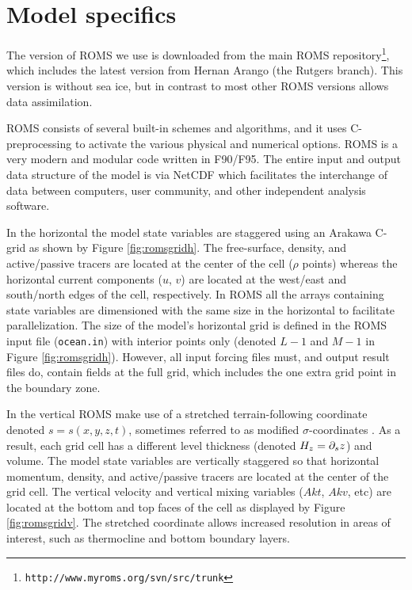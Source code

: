 \clearpage
\section{Model specifics}
\label{sec:setup}
The version of ROMS we use is downloaded from the main ROMS repository\footnote{\texttt{http://www.myroms.org/svn/src/trunk}}, which includes the latest version from Hernan Arango (the Rutgers branch). This version is without sea ice, but in contrast to most other ROMS versions allows data assimilation.

ROMS consists of several built-in schemes and algorithms, and it uses C-preprocessing to activate the various physical and numerical options. ROMS is a very modern and modular code written in F90/F95. The entire input and output data structure of the model is via NetCDF which facilitates the interchange of data between computers, user community, and other independent analysis software.


In the horizontal the model state variables are staggered using an Arakawa C-grid as shown by Figure \ref{fig:romsgridh}. The free-surface, density, and active/passive tracers are located at the center of the cell ($\rho$ points) whereas the horizontal current components ($u$, $v$) are located at the west/east and south/north edges of the cell, respectively. In ROMS all the arrays containing state variables are dimensioned with the same size in the horizontal to facilitate parallelization. The size of the model's horizontal grid is defined in the ROMS input file (\texttt{ocean.in}) with interior points only (denoted $L-1$ and $M-1$ in Figure \ref{fig:romsgridh}). However, all input forcing files must, and output result files do, contain fields at the full grid, which includes the one extra grid point in the boundary zone.

In the vertical ROMS make use of a stretched terrain-following coordinate denoted $s=s(x,y,z,t)$, sometimes referred to as modified $\sigma$-coordinates \citep{song:haidv:1994}. As a result, each grid cell has a different level thickness (denoted $H_z = \partial_{s} z$) and volume. The model state variables are vertically staggered so that horizontal momentum, density, and active/passive tracers are located at the center of the grid cell. The vertical velocity and vertical mixing variables ($Akt$, $Akv$, etc) are located at the bottom and top faces of the cell as displayed by Figure \ref{fig:romsgridv}. The stretched coordinate allows increased resolution in areas of interest, such as thermocline and bottom boundary layers. 


